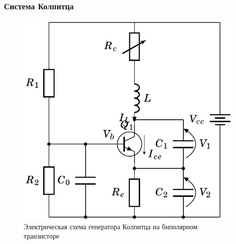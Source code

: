 \documentclass[10pt,utf8]{beamer}
\newlength\TW
\begin{document}
\begin{frame}
  \frametitle{Система Колпитца}

  \begin{figure}[htb!]
  \begin{center}
    \includegraphics[width=50\TW]{p/colp/colp_schem.png}
  \end{center}
  \caption{Электрическая схема генератора Колпитца на биполярном транзисторе}
  \label{atu:f:colp_schem}
  \end{figure}

\end{frame}



\end{document}
